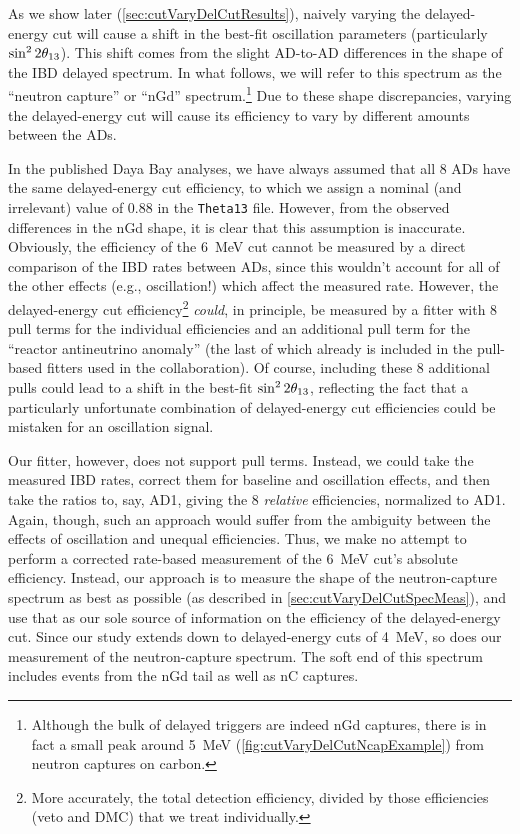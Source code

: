 \documentclass[../thesis.tex]{subfiles}
\begin{document}
As we show later (\autoref{sec:cutVaryDelCutResults}), naively varying the delayed-energy cut will cause a shift in the best-fit oscillation parameters (particularly $\sin^2 2\theta_{13}$). This shift comes from the slight AD-to-AD differences in the shape of the IBD delayed spectrum. In what follows, we will refer to this spectrum as the ``neutron capture'' or ``nGd'' spectrum.\footnote{Although the bulk of delayed triggers are indeed nGd captures, there is in fact a small peak around 5~MeV (\autoref{fig:cutVaryDelCutNcapExample}) from neutron captures on carbon.} Due to these shape discrepancies, varying the delayed-energy cut will cause its efficiency to vary by different amounts between the ADs.

In the published Daya Bay analyses, we have always assumed that all 8 ADs have the same delayed-energy cut efficiency, to which we assign a nominal (and irrelevant) value of 0.88 in the \texttt{Theta13} file. However, from the observed differences in the nGd shape, it is clear that this assumption is inaccurate. Obviously, the efficiency of the 6~MeV cut cannot be measured by a direct comparison of the IBD rates between ADs, since this wouldn't account for all of the other effects (e.g., oscillation!) which affect the measured rate. However, the delayed-energy cut efficiency\footnote{More accurately, the total detection efficiency, divided by those efficiencies (veto and DMC) that we treat individually.} \emph{could}, in principle, be measured by a fitter with 8 pull terms for the individual efficiencies and an additional pull term for the ``reactor antineutrino anomaly'' (the last of which already is included in the pull-based fitters used in the collaboration). Of course, including these 8 additional pulls could lead to a shift in the best-fit $\sin^2 2\theta_{13}$, reflecting the fact that a particularly unfortunate combination of delayed-energy cut efficiencies could be mistaken for an oscillation signal.

Our fitter, however, does not support pull terms. Instead, we could take the measured IBD rates, correct them for baseline and oscillation effects, and then take the ratios to, say, AD1, giving the 8 \emph{relative} efficiencies, normalized to AD1. Again, though, such an approach would suffer from the ambiguity between the effects of oscillation and unequal efficiencies. Thus, we make no attempt to perform a corrected rate-based measurement of the 6~MeV cut's absolute efficiency. Instead, our approach is to measure the shape of the neutron-capture spectrum as best as possible (as described in \autoref{sec:cutVaryDelCutSpecMeas}), and use that as our sole source of information on the efficiency of the delayed-energy cut. Since our study extends down to delayed-energy cuts of 4~MeV, so does our measurement of the neutron-capture spectrum. The soft end of this spectrum includes events from the nGd tail as well as nC captures.
\end{document}
